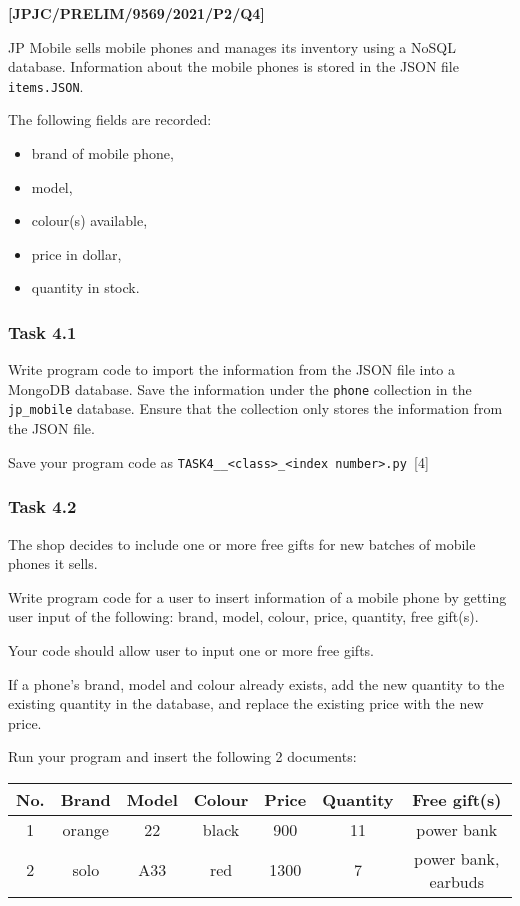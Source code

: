 \item \textbf{{[}JPJC/PRELIM/9569/2021/P2/Q4{]}}

JP Mobile sells mobile phones and manages its inventory using a NoSQL
database. Information about the mobile phones is stored in the JSON
file \texttt{items.JSON}. 

The following fields are recorded: 
\begin{itemize}
\item brand of mobile phone, 
\item model, 
\item colour(s) available, 
\item price in dollar, 
\item quantity in stock. 
\end{itemize}

\subsubsection*{Task 4.1 }

Write program code to import the information from the JSON file into
a MongoDB database. Save the information under the \texttt{phone}
collection in the \texttt{jp\_mobile} database. Ensure that the collection
only stores the information from the JSON file. 

Save your program code as \texttt{TASK4\_<your name>\_<class>\_<index
number>.py }\hfill{}{[}4{]}

\subsubsection*{Task 4.2 }

The shop decides to include one or more free gifts for new batches
of mobile phones it sells. 

Write program code for a user to insert information of a mobile phone
by getting user input of the following: brand, model, colour, price,
quantity, free gift(s). 

Your code should allow user to input one or more free gifts. 

If a phone\textquoteright s brand, model and colour already exists,
add the new quantity to the existing quantity in the database, and
replace the existing price with the new price. 

Run your program and insert the following 2 documents: 
\noindent \begin{center}
\begin{tabular}{|c|c|c|c|c|c|c|}
\hline 
No. & Brand  & Model  & Colour  & Price  & Quantity  & Free gift(s)\tabularnewline
\hline 
1  & orange  & 22  & black  & 900  & 11  & power bank\tabularnewline
\hline 
2  & solo  & A33  & red  & 1300  & 7  & power bank, earbuds\tabularnewline
\hline 
\end{tabular}
\par\end{center}

